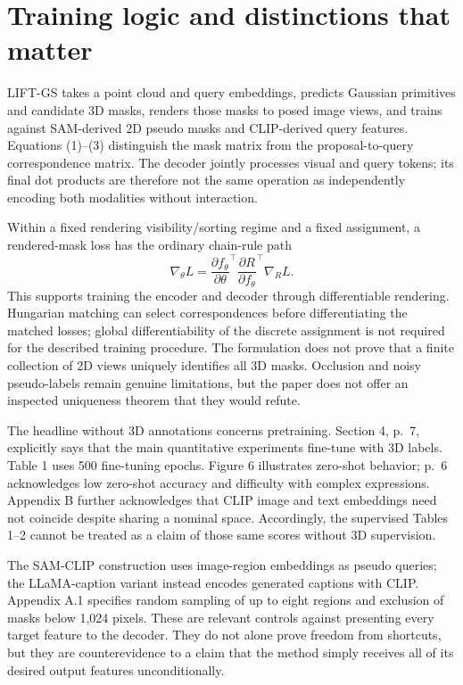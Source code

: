 \documentclass[10pt]{article}
\begin{document}
\section*{Training logic and distinctions that matter}
LIFT-GS takes a point cloud and query embeddings, predicts Gaussian primitives and candidate 3D masks, renders those masks to posed image views, and trains against SAM-derived 2D pseudo masks and CLIP-derived query features. Equations (1)–(3) distinguish the mask matrix from the proposal-to-query correspondence matrix. The decoder jointly processes visual and query tokens; its final dot products are therefore not the same operation as independently encoding both modalities without interaction.\par
Within a fixed rendering visibility/sorting regime and a fixed assignment, a rendered-mask loss has the ordinary chain-rule path \[\nabla_\theta L=
\frac{\partial f_\theta}{\partial\theta}^{\!\top}
\frac{\partial R}{\partial f_\theta}^{\!\top}
\nabla_R L.\] This supports training the encoder and decoder through differentiable rendering. Hungarian matching can select correspondences before differentiating the matched losses; global differentiability of the discrete assignment is not required for the described training procedure. The formulation does not prove that a finite collection of 2D views uniquely identifies all 3D masks. Occlusion and noisy pseudo-labels remain genuine limitations, but the paper does not offer an inspected uniqueness theorem that they would refute.\par
The headline without 3D annotations concerns pretraining. Section 4, p. 7, explicitly says that the main quantitative experiments fine-tune with 3D labels. Table 1 uses 500 fine-tuning epochs. Figure 6 illustrates zero-shot behavior; p. 6 acknowledges low zero-shot accuracy and difficulty with complex expressions. Appendix B further acknowledges that CLIP image and text embeddings need not coincide despite sharing a nominal space. Accordingly, the supervised Tables 1–2 cannot be treated as a claim of those same scores without 3D supervision.\par
The SAM-CLIP construction uses image-region embeddings as pseudo queries; the LLaMA-caption variant instead encodes generated captions with CLIP. Appendix A.1 specifies random sampling of up to eight regions and exclusion of masks below 1,024 pixels. These are relevant controls against presenting every target feature to the decoder. They do not alone prove freedom from shortcuts, but they are counterevidence to a claim that the method simply receives all of its desired output features unconditionally.\par
\end{document}
